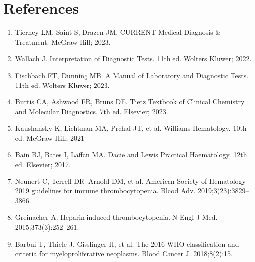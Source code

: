 \section*{References}
\begin{enumerate}
  \item Tierney LM, Saint S, Drazen JM. CURRENT Medical Diagnosis \& Treatment. McGraw-Hill; 2023.
  \item Wallach J. Interpretation of Diagnostic Tests. 11th ed. Wolters Kluwer; 2022.
  \item Fischbach FT, Dunning MB. A Manual of Laboratory and Diagnostic Tests. 11th ed. Wolters Kluwer; 2023.
  \item Burtis CA, Ashwood ER, Bruns DE. Tietz Textbook of Clinical Chemistry and Molecular Diagnostics. 7th ed. Elsevier; 2023.
  \item Kaushansky K, Lichtman MA, Prchal JT, et al. Williams Hematology. 10th ed. McGraw-Hill; 2021.
  \item Bain BJ, Bates I, Laffan MA. Dacie and Lewis Practical Haematology. 12th ed. Elsevier; 2017.
  \item Neunert C, Terrell DR, Arnold DM, et al. American Society of Hematology 2019 guidelines for immune thrombocytopenia. Blood Adv. 2019;3(23):3829--3866.
  \item Greinacher A. Heparin-induced thrombocytopenia. N Engl J Med. 2015;373(3):252--261.
  \item Barbui T, Thiele J, Gisslinger H, et al. The 2016 WHO classification and criteria for myeloproliferative neoplasms. Blood Cancer J. 2018;8(2):15.
\end{enumerate}

\clearpage
